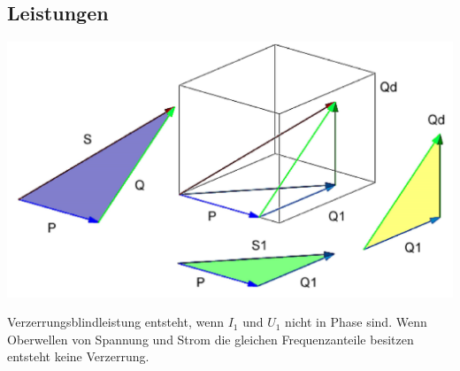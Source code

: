 \subsection{Leistungen}
\begin{minipage}{0.4\linewidth}
    \includegraphics[width=\linewidth]{images/LeistungsDreieck}
\end{minipage}
\hspace{1cm}
\begin{minipage}{0.5\linewidth}
    Verzerrungsblindleistung entsteht, wenn $ I_1 $ und $ U_1 $ nicht in Phase sind. Wenn Oberwellen von Spannung und Strom die gleichen Frequenzanteile besitzen entsteht \newline keine Verzerrung.
\end{minipage}
\renewcommand{\arraystretch}{1.5}
